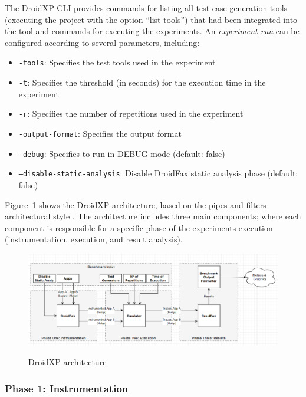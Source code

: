 The DroidXP CLI provides commands for listing all test case
generation tools (executing the project with the option ``list-tools'') that had been
integrated into the tool and commands for executing the experiments. An
\emph{experiment run} can be configured according to several parameters, including:

\begin{itemize}
    \item \texttt{-tools}: Specifies the test tools used in the experiment
    \item \texttt{-t}: Specifies the threshold (in seconds) for the execution time in the experiment
    \item \texttt{-r}: Specifies the number of repetitions used in the experiment
    \item \texttt{-output-format}: Specifies the output format
    \item \texttt{--debug}: Specifies to run in DEBUG mode (default: false)
    \item \texttt{--disable-static-analysis}: Disable DroidFax static analysis phase (default: false)
\end{itemize}

Figure~\ref{fig:benchArq} shows the DroidXP architecture, based on the pipes-and-filters
architectural style \cite{architecture-book}. 
The architecture includes three main components; where each component is responsible for a specific phase of the
experiments execution (instrumentation, execution, and result analysis).

\begin{figure}[thb]
  \includegraphics[width=1\textwidth]{images/benchmark4.png}
  \label{benchArq}
  \caption{DroidXP architecture}
  \label{fig:benchArq}
\end{figure}

\subsubsection{Phase 1: Instrumentation}

